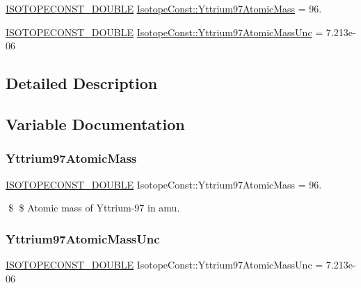 \begin{DoxyCompactItemize}
\item 
\mbox{\hyperlink{group___isotope_const-_macros_ga8f45a7272ce02c0b4c65c44636ed719a}{I\+S\+O\+T\+O\+P\+E\+C\+O\+N\+S\+T\+\_\+\+D\+O\+U\+B\+LE}} \mbox{\hyperlink{group___isotope_const-_yttrium-_y97_gaacab2801a396726ce21c1d08a5b4c775}{Isotope\+Const\+::\+Yttrium97\+Atomic\+Mass}} = 96.
\item 
\mbox{\hyperlink{group___isotope_const-_macros_ga8f45a7272ce02c0b4c65c44636ed719a}{I\+S\+O\+T\+O\+P\+E\+C\+O\+N\+S\+T\+\_\+\+D\+O\+U\+B\+LE}} \mbox{\hyperlink{group___isotope_const-_yttrium-_y97_gada9d66fab8173310c06e6384f523934a}{Isotope\+Const\+::\+Yttrium97\+Atomic\+Mass\+Unc}} = 7.\+213e-\/06
\end{DoxyCompactItemize}


\subsection{Detailed Description}


\subsection{Variable Documentation}
\mbox{\label{group___isotope_const-_yttrium-_y97_gaacab2801a396726ce21c1d08a5b4c775}} 
\subsubsection{\texorpdfstring{Yttrium97\+Atomic\+Mass}{Yttrium97AtomicMass}}
{\footnotesize\ttfamily \mbox{\hyperlink{group___isotope_const-_macros_ga8f45a7272ce02c0b4c65c44636ed719a}{I\+S\+O\+T\+O\+P\+E\+C\+O\+N\+S\+T\+\_\+\+D\+O\+U\+B\+LE}} Isotope\+Const\+::\+Yttrium97\+Atomic\+Mass = 96.}

\$ \$ Atomic mass of Yttrium-\/97 in amu. \mbox{\label{group___isotope_const-_yttrium-_y97_gada9d66fab8173310c06e6384f523934a}} 
\subsubsection{\texorpdfstring{Yttrium97\+Atomic\+Mass\+Unc}{Yttrium97AtomicMassUnc}}
{\footnotesize\ttfamily \mbox{\hyperlink{group___isotope_const-_macros_ga8f45a7272ce02c0b4c65c44636ed719a}{I\+S\+O\+T\+O\+P\+E\+C\+O\+N\+S\+T\+\_\+\+D\+O\+U\+B\+LE}} Isotope\+Const\+::\+Yttrium97\+Atomic\+Mass\+Unc = 7.\+213e-\/06}

